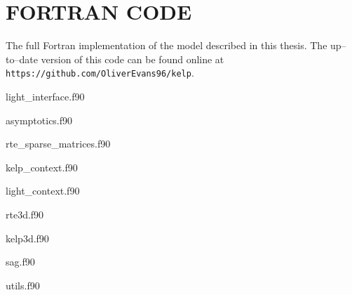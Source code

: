 \chapter{FORTRAN CODE}
\label{chap:fortran}

The full Fortran implementation of the model described in this thesis.
The up--to--date version of this code can be found online at
\texttt{https://github.com/OliverEvans96/kelp}.

light\_interface.f90


asymptotics.f90


rte\_sparse\_matrices.f90


kelp\_context.f90


light\_context.f90


rte3d.f90


kelp3d.f90


sag.f90


utils.f90


